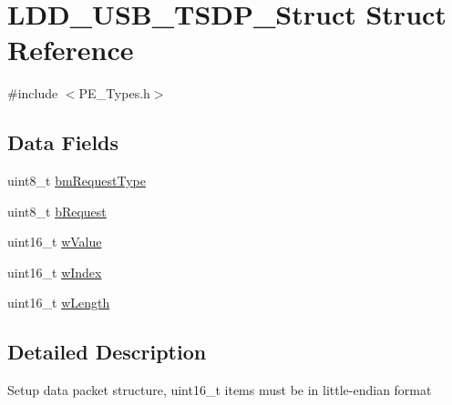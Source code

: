 \hypertarget{struct_l_d_d___u_s_b___t_s_d_p___struct}{\section{L\-D\-D\-\_\-\-U\-S\-B\-\_\-\-T\-S\-D\-P\-\_\-\-Struct Struct Reference}
\label{struct_l_d_d___u_s_b___t_s_d_p___struct}
}


{\ttfamily \#include $<$P\-E\-\_\-\-Types.\-h$>$}

\subsection*{Data Fields}
\begin{DoxyCompactItemize}
\item 
uint8\-\_\-t \hyperlink{struct_l_d_d___u_s_b___t_s_d_p___struct_afddb7f5f46fc265c07889888d1307a79}{bm\-Request\-Type}
\item 
uint8\-\_\-t \hyperlink{struct_l_d_d___u_s_b___t_s_d_p___struct_a38ea083d899a28927d0de58dd646054f}{b\-Request}
\item 
uint16\-\_\-t \hyperlink{struct_l_d_d___u_s_b___t_s_d_p___struct_abe97822a1a8976f53da5a43b8db8cfd3}{w\-Value}
\item 
uint16\-\_\-t \hyperlink{struct_l_d_d___u_s_b___t_s_d_p___struct_af04dcae50f0c8d6b27bd1e70f1af89d6}{w\-Index}
\item 
uint16\-\_\-t \hyperlink{struct_l_d_d___u_s_b___t_s_d_p___struct_a9015bd09ca306fdb49943219fafe3fe3}{w\-Length}
\end{DoxyCompactItemize}


\subsection{Detailed Description}
Setup data packet structure, uint16\-\_\-t items must be in little-\/endian format 


